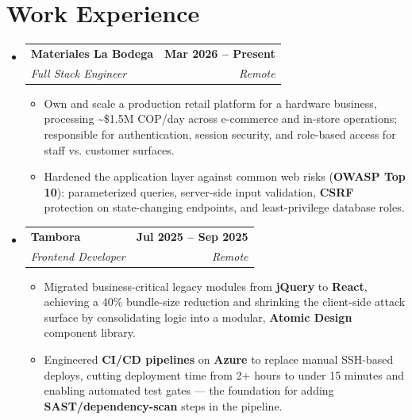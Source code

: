 \documentclass[letterpaper,11pt]{article}
\makeatletter
\newcommand{\resumeItem}[1]{
  \item\small{
    {#1 \vspace{0pt}}
  }
}
\newcommand{\resumeSubheading}[4]{
  \vspace{-2pt}\item
    \begin{tabular*}{1.0\textwidth}[t]{l@{\extracolsep{\fill}}r}
      \textbf{#1} & \textbf{\small #2} \\
      \textit{\small#3} & \textit{\small #4} \\
    \end{tabular*}\vspace{-7pt}
}
\newcommand{\resumeSubHeadingListStart}{\begin{itemize}[leftmargin=0.0in, label={}]}
\newcommand{\resumeSubHeadingListEnd}{\end{itemize}}\vspace{0pt}
\newcommand{\resumeItemListStart}{\begin{itemize}}
\newcommand{\resumeItemListEnd}{\end{itemize}\vspace{-5pt}}
\makeatother
\begin{document}
\section{Work Experience}
\vspace{-1pt}
    \resumeSubHeadingListStart
    \resumeSubheading{Materiales La Bodega}{Mar 2026 -- Present}{Full Stack Engineer}{Remote}
            \resumeItemListStart
                \resumeItem{Own and scale a production retail platform for a hardware business, processing \textasciitilde{}\$1.5M COP/day across e-commerce and in-store operations; responsible for authentication, session security, and role-based access for staff vs. customer surfaces.}
                \resumeItem{Hardened the application layer against common web risks (\textbf{OWASP Top 10}): parameterized queries, server-side input validation, \textbf{CSRF} protection on state-changing endpoints, and least-privilege database roles.}
            \resumeItemListEnd
        \resumeSubheading{Tambora}{Jul 2025 -- Sep 2025}{Frontend Developer}{Remote}
            \resumeItemListStart
                \resumeItem{Migrated business-critical legacy modules from \textbf{jQuery} to \textbf{React}, achieving a 40\% bundle-size reduction and shrinking the client-side attack surface by consolidating logic into a modular, \textbf{Atomic Design} component library.}
                \resumeItem{Engineered \textbf{CI/CD pipelines} on \textbf{Azure} to replace manual SSH-based deploys, cutting deployment time from 2+ hours to under 15 minutes and enabling automated test gates — the foundation for adding \textbf{SAST/dependency-scan} steps in the pipeline.}
            \resumeItemListEnd
    \resumeSubHeadingListEnd
    \vspace{-16pt}
\end{document}
